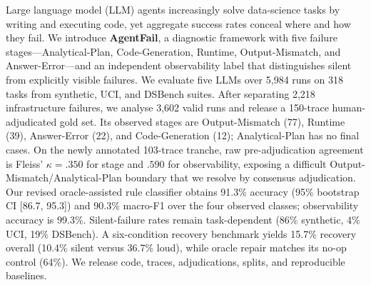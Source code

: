 Large language model (LLM) agents increasingly solve data-science tasks by writing and executing code, yet aggregate success rates conceal where and how they fail. We introduce \textbf{AgentFail}, a diagnostic framework with five failure stages---Analytical-Plan, Code-Generation, Runtime, Output-Mismatch, and Answer-Error---and an independent observability label that distinguishes silent from explicitly visible failures. We evaluate five LLMs over 5{,}984 runs on 318 tasks from synthetic, UCI, and DSBench suites. After separating 2{,}218 infrastructure failures, we analyse 3{,}602 valid runs and release a 150-trace human-adjudicated gold set. Its observed stages are Output-Mismatch (77), Runtime (39), Answer-Error (22), and Code-Generation (12); Analytical-Plan has no final cases. On the newly annotated 103-trace tranche, raw pre-adjudication agreement is Fleiss' $\kappa=.350$ for stage and $.590$ for observability, exposing a difficult Output-Mismatch/Analytical-Plan boundary that we resolve by consensus adjudication. Our revised oracle-assisted rule classifier obtains 91.3\% accuracy (95\% bootstrap CI [86.7, 95.3]) and 90.3\% macro-F1 over the four observed classes; observability accuracy is 99.3\%. Silent-failure rates remain task-dependent (86\% synthetic, 4\% UCI, 19\% DSBench). A six-condition recovery benchmark yields 15.7\% recovery overall (10.4\% silent versus 36.7\% loud), while oracle repair matches its no-op control (64\%). We release code, traces, adjudications, splits, and reproducible baselines.

